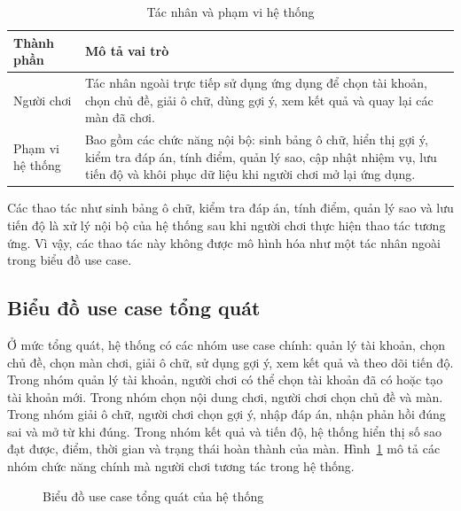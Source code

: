 ﻿\documentclass[../DoAn.tex]{subfiles}
\begin{document}
\begin{table}[H]
\centering
\begin{tabular}{|p{3.2cm}|p{10.8cm}|}
\hline
\textbf{Thành phần} & \textbf{Mô tả vai trò} \\ \hline
Người chơi & Tác nhân ngoài trực tiếp sử dụng ứng dụng để chọn tài khoản, chọn chủ đề, giải ô chữ, dùng gợi ý, xem kết quả và quay lại các màn đã chơi. \\ \hline
Phạm vi hệ thống & Bao gồm các chức năng nội bộ: sinh bảng ô chữ, hiển thị gợi ý, kiểm tra đáp án, tính điểm, quản lý sao, cập nhật nhiệm vụ, lưu tiến độ và khôi phục dữ liệu khi người chơi mở lại ứng dụng. \\ \hline
\end{tabular}
\caption{Tác nhân và phạm vi hệ thống}
\label{table:actors}
\end{table}

Các thao tác như sinh bảng ô chữ, kiểm tra đáp án, tính điểm, quản lý sao và lưu tiến độ là xử lý nội bộ của hệ thống sau khi người chơi thực hiện thao tác tương ứng. Vì vậy, các thao tác này không được mô hình hóa như một tác nhân ngoài trong biểu đồ use case.

\subsection{Biểu đồ use case tổng quát}
\label{subsection:2.2.1}
Ở mức tổng quát, hệ thống có các nhóm use case chính: quản lý tài khoản, chọn chủ đề, chọn màn chơi, giải ô chữ, sử dụng gợi ý, xem kết quả và theo dõi tiến độ. Trong nhóm quản lý tài khoản, người chơi có thể chọn tài khoản đã có hoặc tạo tài khoản mới. Trong nhóm chọn nội dung chơi, người chơi chọn chủ đề và màn. Trong nhóm giải ô chữ, người chơi chọn gợi ý, nhập đáp án, nhận phản hồi đúng sai và mở từ khi đúng. Trong nhóm kết quả và tiến độ, hệ thống hiển thị số sao đạt được, điểm, thời gian và trạng thái hoàn thành của màn. Hình~\ref{fig:usecase-tong-quat} mô tả các nhóm chức năng chính mà người chơi tương tác trong hệ thống.

\begin{figure}[H]
\centering
\resizebox{0.95\textwidth}{!}{}
\caption{Biểu đồ use case tổng quát của hệ thống}
\label{fig:usecase-tong-quat}
\end{figure}
\end{document}
